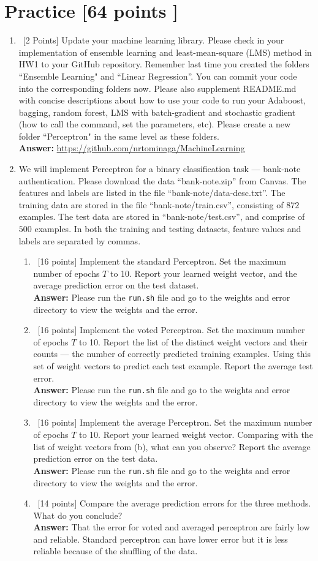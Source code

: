 \documentclass[12pt, fullpage,letterpaper]{article}
\newcommand{\Answer}{{\\\textbf{Answer: }}}
\begin{document}
\section{Practice [64 points ]}
\begin{enumerate}
	\item~[2 Points] Update your machine learning library. Please check in your implementation of ensemble learning and least-mean-square (LMS) method in HW1 to your GitHub repository. Remember last time you created the folders ``Ensemble Learning" and ``Linear Regression''. You can commit your code into the corresponding folders now. Please also supplement README.md with concise descriptions about how to use your code to run your Adaboost, bagging, random forest, LMS with batch-gradient and stochastic gradient (how to call the command, set the parameters, etc). Please create a new folder ``Perceptron" in the same level as these folders.  
	\Answer \url{https://github.com/nrtominaga/MachineLearning}
\item We will implement  Perceptron for a binary classification task --- bank-note authentication. Please download the data ``bank-note.zip'' from Canvas. The features and labels are listed in the file ``bank-note/data-desc.txt''. The training data are stored in the file ``bank-note/train.csv'', consisting of $872$ examples. The test data are stored in ``bank-note/test.csv'', and comprise of $500$ examples. In both the training and testing datasets, feature values and labels are separated by commas. 
\begin{enumerate}
	\item~[16 points] Implement the standard Perceptron. Set the maximum number of epochs $T$ to 10. Report your learned weight vector, and the average prediction error on the test dataset. 
	\Answer Please run the {\tt run.sh} file and go to the weights and error directory to view the weights and the error.
	\item~[16 points] Implement the voted Perceptron. Set the maximum number of epochs $T$ to 10. Report the list of the distinct weight vectors and their counts --- the number of correctly predicted training examples. Using this set of weight vectors to predict each test example. Report the average test error. 
	\Answer Please run the {\tt run.sh} file and go to the weights and error directory to view the weights and the error.
	\item~[16 points] Implement the average Perceptron. Set the maximum number of epochs $T$ to 10. Report your learned weight vector. Comparing with the list of weight vectors from (b), what can you observe? Report the average prediction error on the test data. 
	\Answer Please run the {\tt run.sh} file and go to the weights and error directory to view the weights and the error.
	\item~[14 points] Compare the average prediction errors for the three methods. What do you conclude? 
	\Answer
	That the error for voted and averaged perceptron are fairly low and reliable.  Standard perceptron can have lower error but it is less reliable because of the shuffling of the data.
\end{enumerate}


\end{enumerate}
\end{document}
